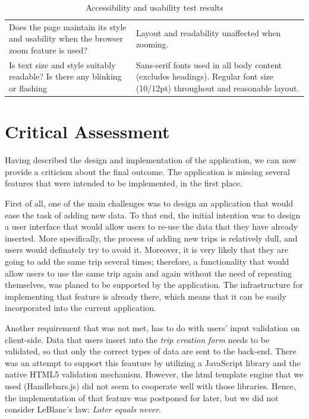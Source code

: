 \begin{table}
\begin{tabular}{|p{150px}|p{250px}|}
    Does the page maintain its style and usability when the browser zoom feature is used? & Layout and readability unaffected when zooming. \\

    Is text size and style suitably readable? Is there any blinking or flashing & Sans-serif fonts used in all body content (excludes headings). Regular font size (10/12pt) throughout and reasonable layout. \\ \hline

    \hline
  \end{tabular}
  \caption{Accessibility and usability test results}\label{accessUsabTest}
\end{table}

\section{Critical Assessment}

Having described the design and implementation of the application, we can now provide a criticism about the final outcome. The application is missing several features that were intended to be implemented, in the first place.

First of all, one of the main challenges was to design an application that would ease the task of adding new data. To that end, the initial intention was to design a user interface that would allow users to re-use the data that they have already inserted. More specifically, the process of adding new trips is relatively dull, and users would definately try to avoid it. Moreover, it is very likely that they are going to add the same trip several times; therefore, a functionality that would allow users to use the same trip again and again without the need of repeating themselves, was planed to be supported by the application. The infrastructure for implementing that feature is already there, which means that it can be easily incorporated into the current application.

Another requirement that was not met, has to do with users' input validation on client-side. Data that users insert into the \emph{trip creation form} needs to be validated, so that only the correct types of data are sent to the back-end. There was an attempt to support this feauture by utilizing a JavaScript library and the native HTML5 validation mechanism. However, the html template engine that we used (Handlebars.js) did not seem to cooperate well with those libraries. Hence, the implementation of that feature was postponed for later, but we did not consider LeBlanc's law: \emph{Later equals never}.

